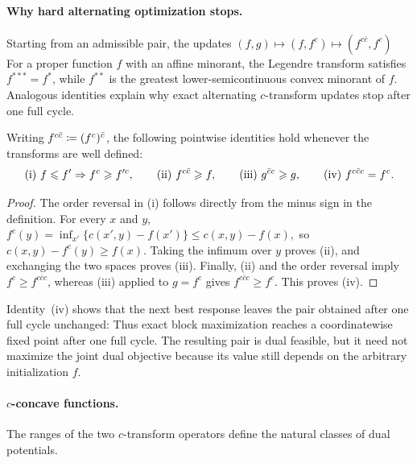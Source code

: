 \paragraph{Why hard alternating optimization stops.}
Starting from an admissible pair, the updates
\((f,g)\longmapsto(f,f^c)\longmapsto(f^{c\bar c},f^c)\)
For a proper function $f$ with an affine minorant, the Legendre transform satisfies $f^{***}=f^*$, while $f^{**}$ is the greatest lower-semicontinuous convex minorant of $f$. Analogous identities explain why exact alternating $c$-transform updates stop after one full cycle.

\begin{prop}\label{prop-c-transform-algebra}
Writing $f^{c\bar c}\coloneqq(f^c)^{\bar c}$, the following pointwise identities hold whenever the transforms are well defined:
\[
\textnormal{(i) } f \leqslant f' \Rightarrow f^{c}\geqslant f'^{c},
\qquad
\textnormal{(ii) } f^{c\bar{c}} \geqslant f,
\qquad
\textnormal{(iii) } g^{\bar{c}c} \geqslant g,
\qquad
\textnormal{(iv) } f^{c\bar{c}c}=f^{c}.
\]
\end{prop}
\begin{proof}
The order reversal in (i) follows directly from the minus sign in the definition. For every $x$ and $y$, \(f^c(y)=\inf_{x'}\{c(x',y)-f(x')\} \leq c(x,y)-f(x),\)
so $c(x,y)-f^c(y)\geq f(x)$. Taking the infimum over $y$ proves (ii), and exchanging the two spaces proves (iii). Finally, (ii) and the order reversal imply
$f^c\geq f^{c\bar c c}$, whereas (iii) applied to $g=f^c$ gives
$f^{c\bar c c}\geq f^c$. This proves (iv).
\end{proof}
Identity~(iv) shows that the next best response leaves the pair obtained after one full cycle unchanged:
Thus exact block maximization reaches a coordinatewise fixed point after one full cycle. The resulting pair is dual feasible, but it need not maximize the joint dual objective because its value still depends on the arbitrary initialization $f$.

\paragraph{\texorpdfstring{$c$-concave functions.}{c-concave functions.}}
The ranges of the two $c$-transform operators define the natural classes of dual potentials.

